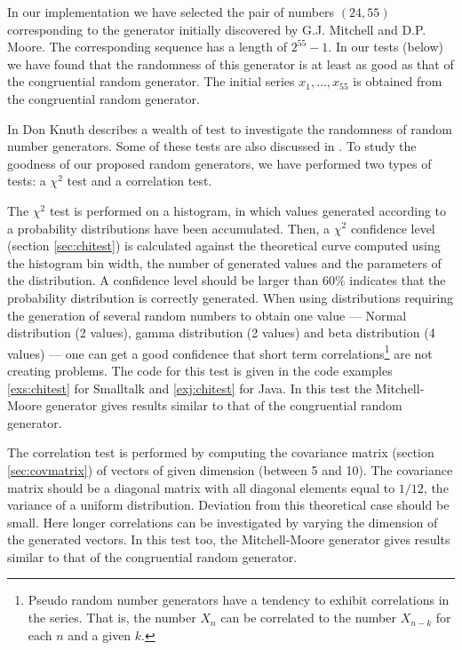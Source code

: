\documentclass[twoside]{book}
\begin{document}
In our implementation we have selected the pair of numbers
$\left(24,55\right)$ corresponding to the generator initially
discovered by G.J. Mitchell and D.P. Moore\cite{Knuth2}. The
corresponding sequence has a length of $2^{55}-1$. In our tests
(\cf below) we have found that the randomness of this generator is
at least as good as that of the congruential random generator. The
initial series $x_1,\ldots,x_{55}$ is obtained from the
congruential random generator.

In \cite{Knuth2} Don Knuth describes a wealth of test to
investigate the randomness of random number generators. Some of
these tests are also discussed in \cite{LawKel}. To study the
goodness of our proposed random generators, we have performed two
types of tests: a $\chi^2$ test and a correlation test.

The $\chi^2$ test is performed on a histogram, in which values
generated according to a probability distributions have been
accumulated. Then, a $\chi^2$ confidence level (\cf section
\ref{sec:chitest}) is calculated against the theoretical curve
computed using the histogram bin width, the number of generated
values and the parameters of the distribution. A confidence level
should be larger than $60\%$ indicates that the probability
distribution is correctly generated. When using distributions
requiring the generation of several random numbers to obtain one
value --- Normal distribution (2 values), gamma distribution (2
values) and beta distribution (4 values)
--- one can get a good confidence that short term
correlations\footnote{Pseudo random number generators have a
tendency to exhibit correlations in the series. That is, the
number $X_n$ can be correlated to the number $X_{n-k}$ for each
$n$ and a given $k$.} are not creating problems. The code for this
test is given in the code examples \ref{exs:chitest} for Smalltalk
and \ref{exj:chitest} for Java. In this test the Mitchell-Moore
generator gives results similar to that of the congruential random
generator.

The correlation test is performed by computing the covariance
matrix (\cf section \ref{sec:covmatrix}) of vectors of given
dimension (between 5 and 10). The covariance matrix should be a
diagonal matrix with all diagonal elements equal to $1/12$, the
variance of a uniform distribution. Deviation from this
theoretical case should be small. Here longer correlations can be
investigated by varying the dimension of the generated vectors. In
this test too, the Mitchell-Moore generator gives results similar
to that of the congruential random generator.
\end{document}
